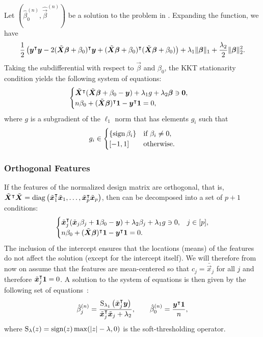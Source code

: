 Let \((\hat{\beta}_0^{(n)}, \hat{\vec{\beta}}^{(n)})\) be a solution to the problem in
. Expanding the function, we have
\[
  \frac{1}{2}\left( \boldsymbol y^\intercal \boldsymbol y - 2(\tilde{\boldsymbol{X}}\boldsymbol{\beta} + \beta_0)^\intercal\boldsymbol{y} + (\tilde{\boldsymbol{X}}\boldsymbol{\beta} + \beta_0)^\intercal(\tilde{\boldsymbol{X}}\boldsymbol{\beta} + \beta_0)\right)
  + \lambda_1 \lVert \boldsymbol\beta \rVert_1 + \frac{\lambda_2}{2}\lVert \boldsymbol \beta \rVert_2^2.
\]
Taking the subdifferential with respect to \(\vec{\beta}\) and \(\beta_0\), the KKT
stationarity condition yields the following system of equations:
\begin{equation}
  \label{eq:kkt-elasticnet}
  \begin{cases}
    \tilde{\boldsymbol{X}}^\intercal(\tilde{\boldsymbol{X}}\boldsymbol{\beta} + \beta_0 - \boldsymbol{y}) + \lambda_1 g + \lambda_2 \boldsymbol\beta \ni \boldsymbol{0}, \\
    n \beta_0 + (\tilde{\boldsymbol{X}}\boldsymbol{\beta})^\intercal \boldsymbol{1} - \boldsymbol{y}^\intercal \boldsymbol{1} = 0,
  \end{cases}
\end{equation}
where \(g\) is a subgradient of the \(\ell_1\) norm that has elements \(g_i\) such that
\[
  g_i \in
  \begin{cases}
    \{\operatorname{sign}{\beta_i}\} & \text{if } \beta_i \neq 0, \\
    [-1, 1]            & \text{otherwise}.
  \end{cases}
\]

\subsubsection{Orthogonal Features}

If the features of the normalized design matrix are orthogonal, that is,
\(\tilde{\boldsymbol{X}}^\intercal \tilde{\boldsymbol{X}} = \operatorname{diag}\left(\tilde{\boldsymbol{x}}_1^\intercal
\tilde{\boldsymbol{x}}_1, \dots, \tilde{\boldsymbol{x}}_p^\intercal \tilde{\boldsymbol{x}}_p\right) \), then
 can be decomposed into a set of \(p + 1\) conditions:
%
\[
  \begin{cases}
    \tilde{\boldsymbol{x}}_j^\intercal (\tilde{\boldsymbol{x}}_j \beta_j + \boldsymbol{1} \beta_0 - \boldsymbol{y}) + \lambda_2 \beta_j + \lambda_1 g \ni 0, & j \in [p], \\
    n \beta_0 + (\tilde{\boldsymbol{X}}\boldsymbol{\beta})^\intercal \boldsymbol{1} -  \boldsymbol{y}^\intercal \boldsymbol{1} = 0.
  \end{cases}
\]
%
The inclusion of the intercept ensures that the locations (means) of the features do not
affect the solution (except for the intercept itself). We will therefore from now on assume
that the features are mean-centered so that \(c_j = \bar{\vec{x}}_j\) for all \(j\) and
therefore \(\tilde{\boldsymbol{x}}_j^\intercal \boldsymbol{1} = 0\). A solution to the system of equations is then
given by the following set of equations~\citep{donoho1994}:
%
\begin{equation*}
  \hat{\beta}^{(n)}_j = \frac{\operatorname{S}_{\lambda_1}\left(\tilde{\boldsymbol{x}}_j^\intercal \boldsymbol{y}\right)}{\tilde{\boldsymbol{x}}_j^\intercal \tilde{\boldsymbol{x}}_j + \lambda_2},
  \qquad
  \hat{\beta}_0^{(n)} = \frac{\boldsymbol{y}^\intercal \boldsymbol{1}}{n},
\end{equation*}
%
where \(\operatorname{S}_\lambda(z) = \operatorname{sign}(z) \max(|z| - \lambda, 0)\) is the soft-thresholding
operator.

